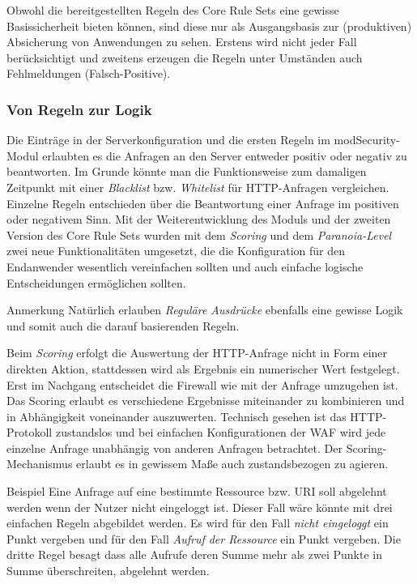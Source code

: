 Obwohl die bereitgestellten Regeln des Core Rule Sets eine gewisse Basissicherheit bieten können, sind diese nur als Ausgangsbasis zur (produktiven) Absicherung von Anwendungen zu sehen. Erstens wird nicht jeder Fall berücksichtigt und zweitens erzeugen die Regeln unter Umständen auch Fehlmeldungen (Falsch-Positive).

\subsubsection{Von Regeln zur Logik}
Die Einträge in der Serverkonfiguration und die ersten Regeln im modSecurity-Modul erlaubten es die Anfragen an den Server entweder positiv oder negativ zu beantworten. Im Grunde könnte man die Funktionsweise zum damaligen Zeitpunkt mit einer \emph{Blacklist} bzw. \emph{Whitelist} für HTTP-Anfragen vergleichen. Einzelne Regeln entschieden über die Beantwortung einer Anfrage im positiven oder negativem Sinn. Mit der Weiterentwicklung des Moduls und der zweiten Version des Core Rule Sets wurden mit dem \emph{Scoring} und dem \emph{Paranoia-Level} zwei neue Funktionalitäten umgesetzt, die die Konfiguration für den Endanwender wesentlich vereinfachen sollten und auch einfache logische Entscheidungen ermöglichen sollten.

\textcolor{bhtGray}{ Anmerkung} Natürlich erlauben \emph{Reguläre Ausdrücke} ebenfalls eine gewisse Logik und somit auch die darauf basierenden Regeln.

Beim \emph{Scoring} erfolgt die Auswertung der HTTP-Anfrage nicht in Form einer direkten Aktion, stattdessen wird als Ergebnis ein numerischer Wert festgelegt. Erst im Nachgang entscheidet die Firewall wie mit der Anfrage umzugehen ist. Das Scoring erlaubt es verschiedene Ergebnisse miteinander zu kombinieren und in Abhängigkeit voneinander auszuwerten. Technisch gesehen ist das HTTP-Protokoll zustandslos und bei einfachen Konfigurationen der WAF  wird jede einzelne Anfrage unabhängig von anderen Anfragen betrachtet. Der Scoring-Mechanismus erlaubt es in gewissem Maße auch zustandsbezogen zu agieren. 


\textcolor{bhtGray}{ Beispiel} Eine Anfrage auf eine bestimmte Ressource bzw. URI soll abgelehnt werden wenn der Nutzer nicht eingeloggt ist. Dieser Fall wäre könnte mit drei einfachen Regeln abgebildet werden. Es wird für den Fall \emph{nicht eingeloggt} ein Punkt vergeben und für den Fall \emph{Aufruf der Ressource} ein Punkt vergeben. Die dritte Regel besagt dass alle Aufrufe deren Summe mehr als zwei Punkte in Summe überschreiten, abgelehnt werden.

